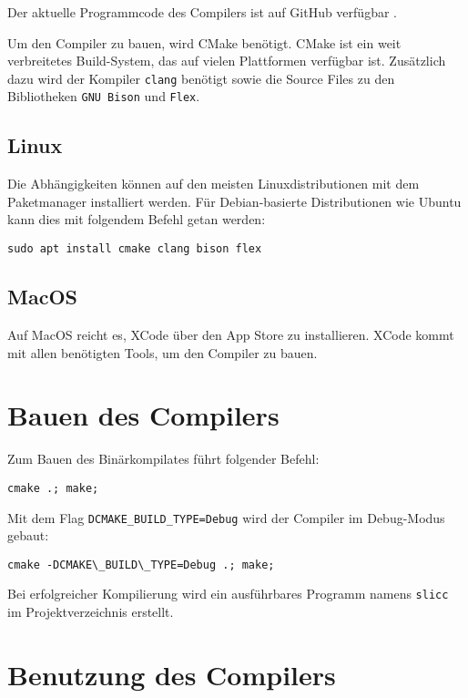 Der aktuelle Programmcode des Compilers ist auf GitHub verfügbar \cite{pascalernstSLICC2024}.

Um den Compiler zu bauen, wird CMake benötigt. CMake ist ein weit verbreitetes Build-System, das auf vielen Plattformen verfügbar ist.
Zusätzlich dazu wird der Kompiler \texttt{clang} benötigt sowie die Source Files zu den Bibliotheken \texttt{GNU Bison} und \texttt{Flex}.

\subsection{Linux}

Die Abhängigkeiten können auf den meisten Linuxdistributionen mit dem Paketmanager installiert werden.
Für Debian-basierte Distributionen wie Ubuntu kann dies mit folgendem Befehl getan werden:

\begin{lstlisting}
sudo apt install cmake clang bison flex
\end{lstlisting}

\subsection{MacOS}

Auf MacOS reicht es, XCode über den App Store zu installieren.
XCode kommt mit allen benötigten Tools, um den Compiler zu bauen.

\section{Bauen des Compilers}

Zum Bauen des Binärkompilates führt folgender Befehl:

\begin{lstlisting}
cmake .; make;
\end{lstlisting}

Mit dem Flag \texttt{DCMAKE\_BUILD\_TYPE=Debug} wird der Compiler im Debug-Modus gebaut:

\begin{lstlisting}
cmake -DCMAKE\_BUILD\_TYPE=Debug .; make;
\end{lstlisting}

Bei erfolgreicher Kompilierung wird ein ausführbares Programm namens \texttt{slicc} im Projektverzeichnis erstellt.

\section{Benutzung des Compilers}

